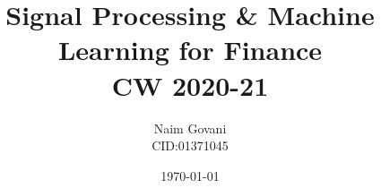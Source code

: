 \documentclass[a4paper, twoside]{report}
\begin{document}
    \title{Signal Processing \& Machine Learning for Finance \\ CW 2020-21}
    \author{Naim Govani \\ CID:01371045}
    \date{\today}
    \maketitle

    \tableofcontents

    
    
    
    
    
\end{document}
